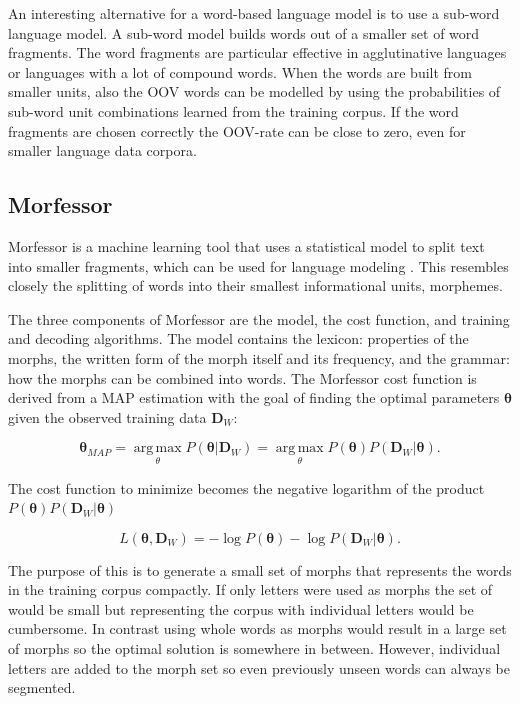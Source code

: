 \documentclass[b5paper]{article}
\begin{document}
An interesting alternative for a word-based language model is to use a sub-word language model. A sub-word model builds words out of a smaller set of word fragments. The word fragments are particular effective in agglutinative languages or languages with a lot of compound words. When the words are built from smaller units, also the OOV words can be modelled by using the probabilities of sub-word unit combinations learned from the training corpus. If the word fragments are chosen correctly the OOV-rate can be close to zero, even for smaller language data corpora.

\subsection{Morfessor}
Morfessor is a machine learning tool that uses a statistical model to split text into smaller fragments, which can be used for language modeling \cite{creutz2007unsupervised}. This resembles closely the splitting of words into their smallest informational units, morphemes. 

The three components of Morfessor are the model, the cost function, and training and decoding algorithms. The model contains the lexicon: properties of the morphs, the written form of the morph itself and its frequency, and the grammar: how the morphs can be combined into words. The Morfessor cost function is derived from a MAP estimation with the goal of finding the optimal parameters $\bm{\theta}$ given the observed training data $\bm{D}_W$:

\begin{equation}
\bm{\theta}_{MAP}=\operatorname*{arg\,max}_{\theta}P(\bm{\theta}|\bm{D}_W)=\operatorname*{arg\,max}_{\theta}P(\bm{\theta})P(\bm{D}_W|\bm{\theta}).
\end{equation}

The cost function to minimize becomes the negative logarithm of the product  $P(\bm{\theta})P(\bm{D}_W|\bm{\theta})$

\begin{equation}
L(\bm{\theta}, \bm{D}_W)=-\log P(\bm{\theta})-\log P(\bm{D}_W|\bm{\theta}).
\end{equation}

The purpose of this is to generate a small set of morphs that represents the words in the training corpus compactly. If only letters were used as morphs the set of would be small but representing the corpus with individual letters would be cumbersome. In contrast using whole words as morphs would result in a large set of morphs so the optimal solution is somewhere in between. However, individual letters are added to the morph set so even previously unseen words can always be segmented.
\end{document}
